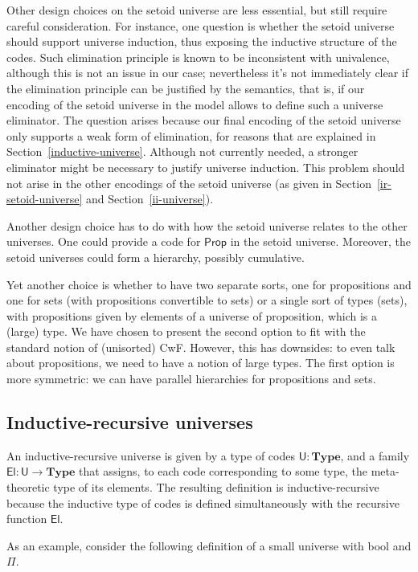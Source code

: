 \documentclass[a4paper,UKenglish,cleveref, autoref, thm-restate]{lipics-v2019}
\newcommand{\mType}{\mathbf{Type}}
\newcommand{\Prop}{\textsf{Prop}}
\newcommand{\U}{\textsf{U}}
\newcommand{\El}{\textsf{El}}
\begin{document}
Other design choices on the setoid universe are less essential, but still
require careful consideration. For instance, one question is whether the setoid
universe should support universe induction, thus exposing the inductive
structure of the codes. Such elimination principle is known to be inconsistent
with univalence, although this is not an issue in our case; nevertheless it's
not immediately clear if the elimination principle can be justified by the
semantics, that is, if our encoding of the setoid universe in the model allows
to define such a universe eliminator.
%
The question arises because our final encoding of the setoid universe only
supports a weak form of elimination, for reasons that are explained in
Section~\ref{inductive-universe}. Although not currently needed, a stronger
eliminator might be necessary to justify universe induction. This problem should
not arise in the other encodings of the setoid universe (as given in
Section~\ref{ir-setoid-universe} and Section~\ref{ii-universe}).

Another design choice has to do with how the setoid universe relates to the
other universes. One could provide a code for $\Prop$ in the setoid universe.
Moreover, the setoid universes could form a hierarchy, possibly
cumulative.

Yet another choice is whether to have two separate sorts, one for propositions
and one for sets (with propositions convertible to sets) or a single sort of
types (sets), with propositions given by elements of a universe of proposition,
which is a (large) type. We have chosen to present the second option to fit with
the standard notion of (unisorted) CwF. However, this has downsides: to even
talk about propositions, we need to have a notion of large types. The first
option is more symmetric: we can have parallel hierarchies for propositions and
sets.

\subsection{Inductive-recursive universes}\label{ir-universes}

An inductive-recursive universe is given by a type of codes $\U : \mType$, and a
family $\El : \U \to \mType$ that assigns, to each code corresponding to some
type, the meta-theoretic type of its elements. The resulting definition is
inductive-recursive because the inductive type of codes is defined
simultaneously with the recursive function $\El$.

As an example, consider the following definition of a small universe with
bool and $\Pi$.
\end{document}
